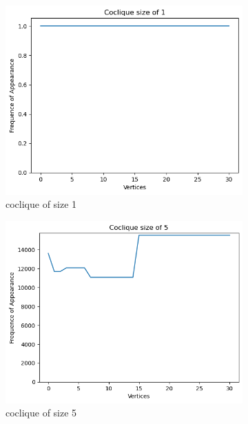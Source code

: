 \documentclass{amsart}
\theoremstyle{definition}
\begin{document}
\begin{appendix}
\begin{figure}[hbt!]
	\caption*{Depth 5}
	\begin{subfigure}[b]{.45\textwidth}
		\centering
		\includegraphics[width=1\linewidth]{depth_5_size_1.png}
		\caption{coclique of size 1}
	\end{subfigure}
	\begin{subfigure}[b]{.45\textwidth}
		\centering
		\includegraphics[width=1\linewidth]{depth_5_size_5.png}
		\caption{coclique of size 5}
	\end{subfigure}
	\begin{subfigure}[b]{.45\textwidth}
		\centering

\end{subfigure}
\end{figure}
\end{appendix}
\end{document}
